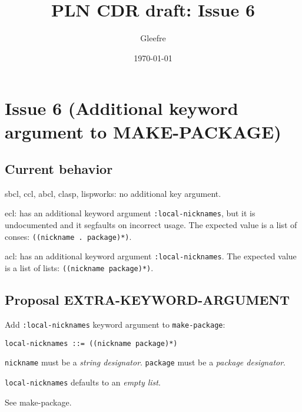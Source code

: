 \documentclass[11pt]{article}
\author{Gleefre}
\date{\today}
\title{PLN CDR draft: Issue 6}
\begin{document}
\maketitle

\section{Issue 6 (Additional keyword argument to MAKE-PACKAGE)}
\label{sec:orge489ce0}
\subsection{Current behavior}
\label{sec:orgf63acdd}
sbcl, ccl, abcl, clasp, lispworks: no additional key argument.

ecl: has an additional keyword argument \texttt{:local-nicknames}, but it is undocumented
and it segfaults on incorrect usage. The expected value is a list of conses:
\texttt{((nickname . package)*)}.

acl: has an additional keyword argument \texttt{:local-nicknames}. The expected value is
a list of lists: \texttt{((nickname package)*)}.
\subsection{Proposal EXTRA-KEYWORD-ARGUMENT}
\label{sec:org216fea6}
Add \texttt{:local-nicknames} keyword argument to \texttt{make-package}:
\begin{verbatim}
local-nicknames ::= ((nickname package)*)
\end{verbatim}

\texttt{nickname} must be a \emph{string designator}.
\texttt{package} must be a \emph{package designator}.

\texttt{local-nicknames} defaults to an \emph{empty list}.

See make-package.
\end{document}
